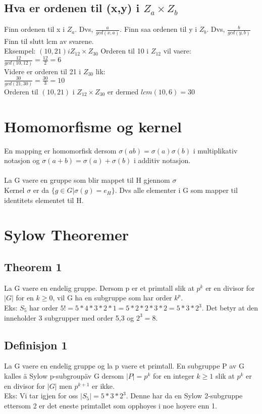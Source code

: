 \documentclass[12pt,a4paper]{article}
\begin{document}
\subsection*{Hva er ordenen til (x,y) i $Z_a \times Z_b$}
Finn ordenen til x i $Z_a$. Dvs, $\frac{a}{gcd(x,a)}. $
Finn saa ordenen til y i $Z_b$. Dvs, $\frac{b}{gcd(y,b)}$
Finn til slutt lcm av svarene.\\
Eksempel: $(10,21) i Z_{12} \times Z_{30}$
Orderen til 10 i $Z_12$ vil vaere:\\
$\frac{12}{gcd(10,12)} = \frac{12}{2} = 6$\\
Videre er orderen til 21 i $Z_{30}$ lik:\\
$\frac{30}{gcd(21,30)} = \frac{30}{3} = 10$\\
Orderen til $(10,21)$ i $Z_{12} \times Z_{30}$ er dermed $lcm(10,6) = 30$\\

\section*{Homomorfisme og kernel}
En mapping er homomorfisk dersom $\sigma(ab) = \sigma(a) \sigma(b)$ i multiplikativ notasjon og $\sigma(a+b) = \sigma(a) + \sigma(b)$ i additiv notasjon. \\\\

La G vaere en gruppe som blir mappet til H gjennom $\sigma$\\
Kernel $\sigma$ er da $\{g\in G | \sigma(g) = e_H\}$. Dvs alle elementer i G som mapper til identitets elementet til H.

\section*{Sylow Theoremer}
\subsection*{Theorem 1}
La G vaere en endelig gruppe. Dersom p er et primtall slik at $p^k$ er en divisor for $|G|$ for en $k\geq0$, vil G ha en subgruppe som har order $k^p$. \\
Eks: $S_5$ har order $5! = 5*4*3*2*1 = 5*2*2*3*2 = 5*3*2^3$. Det betyr at den inneholder 3 subgrupper med order 5,3 og $2^3 = 8$.

\subsection*{Definisjon 1}
La G vaere en endelig gruppe og la p vaere et primtall. En subgruppe P av G kalles \"a Sylow p-subgroup\" av G  dersom $|P| = p^k$ for en integer $k\geq 1$ slik at $p^k$ er en divisor for $|G|$ men $p^{k+1}$ er ikke.\\
Eks: Vi tar igjen for oss $|S_5| = 5*3*2^3$. Denne har da en Sylow 2-subgruppe ettersom 2 er det eneste primtallet som opphoyes i noe hoyere enn 1. 
\end{document}
